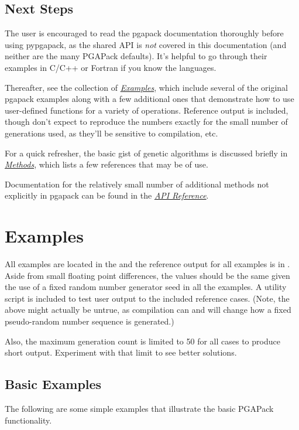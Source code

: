 \documentclass[letterpaper,11pt,english]{sphinxmanual}
\begin{document}
\section{Next Steps}
\label{getting_started:next-steps}
The user is encouraged to read the pgapack documentation thoroughly
before using pypgapack, as the shared API is \emph{not} covered in this
documentation (and neither are the many PGAPack defaults).  It's
helpful to go through their examples in C/C++ or Fortran if you
know the languages.

Thereafter, see the collection of {\hyperref[examples:sec-examples]{\emph{Examples}}}, which
include several of the original pgapack examples along with a few additional
ones that demonstrate how to use user-defined functions for a variety
of operations.  Reference output is included, though don't expect
to reproduce the numbers exactly for the small number of generations
used, as they'll be sensitive to compilation, etc.

For a quick refresher, the basic gist of genetic algorithms is
discussed briefly
in {\hyperref[methods:sec-methods]{\emph{Methods}}}, which lists a few references that may
be of use.

Documentation for the relatively small number of additional methods
not explicitly in pgapack can be found in the {\hyperref[api_reference:sec-reference]{\emph{API Reference}}}.


\chapter{Examples}
\label{examples:sec-examples}\label{examples::doc}\label{examples:examples}
All examples are located in the  and the
reference output for all examples is in .
Aside from small floating point differences, the values should be
the same given the use of a fixed random number generator seed in
all the examples.  A utility script  is included
to test user output to the included reference cases.  (Note, the above
might actually be untrue, as compilation can and will change how
a fixed pseudo-random number sequence is generated.)

Also, the maximum generation count is limited to
50 for all cases to produce short output.  Experiment with that limit
to see better solutions.


\section{Basic Examples}
\label{examples:basic-examples}\label{examples:sec-basicexamples}
The following are some simple examples that illustrate
the basic PGAPack functionality.
\end{document}
